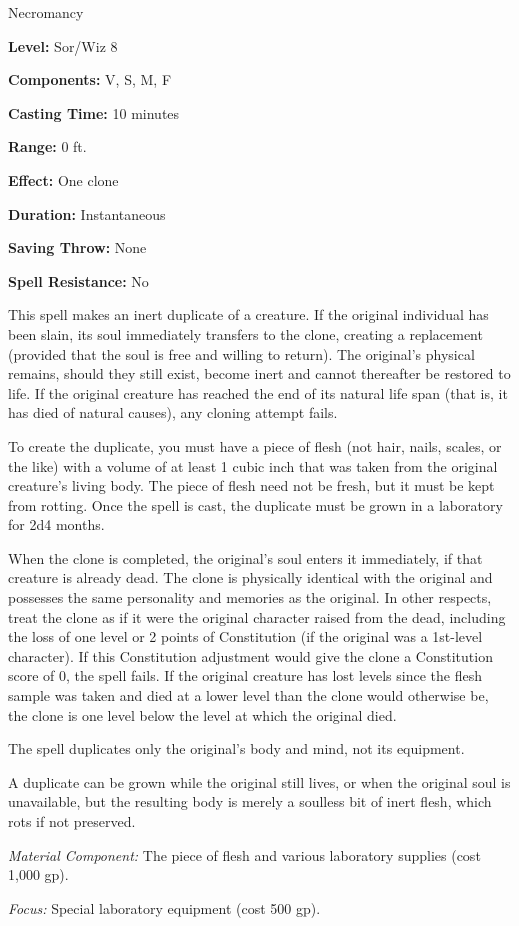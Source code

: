 
Necromancy

\textbf{Level:} Sor/Wiz 8

\textbf{Components:} V, S, M, F

\textbf{Casting Time:} 10 minutes

\textbf{Range:} 0 ft.

\textbf{Effect:} One clone

\textbf{Duration:} Instantaneous

\textbf{Saving Throw:} None

\textbf{Spell Resistance:} No

This spell makes an inert duplicate of a creature. If the original individual has 
been slain, its soul immediately transfers to the clone, creating a replacement 
(provided that the soul is free and willing to return). The original's physical 
remains, should they still exist, become inert and cannot thereafter be restored 
to life. If the original creature has reached the end of its natural life span 
(that is, it has died of natural causes), any cloning attempt fails.

To create the duplicate, you must have a piece of flesh (not hair, nails, scales, 
or the like) with a volume of at least 1 cubic inch that was taken from the original 
creature's living body. The piece of flesh need not be fresh, but it must be kept 
from rotting. Once the spell is cast, the duplicate must be grown in a laboratory 
for 2d4 months.

When the clone is completed, the original's soul enters it immediately, if that 
creature is already dead. The clone is physically identical with the original and 
possesses the same personality and memories as the original. In other respects, 
treat the clone as if it were the original character raised from the dead, including 
the loss of one level or 2 points of Constitution (if the original was a 1st-level 
character). If this Constitution adjustment would give the clone a Constitution 
score of 0, the spell fails. If the original creature has lost levels since the 
flesh sample was taken and died at a lower level than the clone would otherwise 
be, the clone is one level below the level at which the original died.

The spell duplicates only the original's body and mind, not its equipment.

A duplicate can be grown while the original still lives, or when the original soul 
is unavailable, but the resulting body is merely a soulless bit of inert flesh, 
which rots if not preserved.

\textit{Material Component:} The piece of flesh and various laboratory supplies 
(cost 1,000 gp).

\textit{Focus:} Special laboratory equipment (cost 500 gp).

